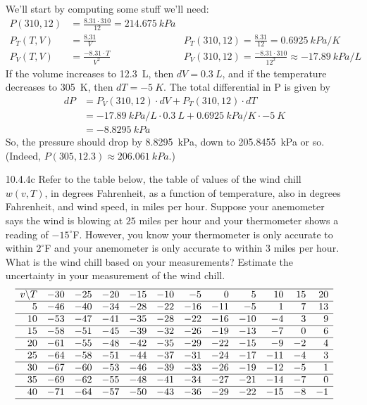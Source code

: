 \begin{enumerate}[leftmargin=0pt]
    \begin{red}
    We'll start by computing some stuff we'll need:
    \begin{align*}
        P(310, 12) &= \frac{8.31\cdot310}{12} = \SI{214.675}{kPa} \\
        P_T(T, V) &= \frac{8.31}{V}
        &P_T(310, 12) = \frac{8.31}{12} = \SI{0.6925}{kPa / K}\\
        P_V(T, V) &= \frac{-8.31\cdot T}{V^2}
        &P_V(310, 12) = \frac{-8.31\cdot 310}{12^2} \approx \SI{-17.89}{kPa / L}
    \end{align*}
    If the volume increases to \SI{12.3}{L}, then $dV = \SI{0.3}{L}$, and if the temperature decreases to \SI{305}{K}, then $dT = \SI{-5}{K}$. The total differential in P is given by 
    \begin{align*}
        dP &= P_V(310, 12) \cdot dV + P_T(310, 12) \cdot dT \\
        &= \SI{-17.89}{kPa / L} \cdot \SI{0.3}{L} + \SI{0.6925}{kPa / K}\cdot \SI{-5}{K} \\
        &= \SI{-8.8295 }{kPa}
    \end{align*}
    So, the pressure should drop by \SI{8.8295 }{kPa}, down to \SI{205.8455}{kPa} or so. (Indeed, $P(305, 12.3) \approx \SI{206.061}{kPa}$.)
    \end{red}
    \pagebreak
    
    \item[10.4.4c] Refer to the table below, the table of values of the wind chill $w(v, T)$, in degrees Fahrenheit, as a function of temperature, also in degrees Fahrenheit, and wind speed, in miles per hour. Suppose your anemometer says the wind is blowing at $25$ miles per hour and your thermometer shows a reading of $-15^\circ$F. However, you know your thermometer is only accurate to within $2^\circ$F and your anemometer is only accurate to within 3 miles per hour. What is the wind chill based on your measurements? Estimate the uncertainty in your measurement of the wind chill.
\[\begin{array}{rrrrrrrrrrrr}
\hline v \backslash T & -30 & -25 & -20 & -15 & -10 & -5 & 0 & 5 & 10 & 15 & 20 \\
\hline 5 & -46 & -40 & -34 & -28 & -22 & -16 & -11 & -5 & 1 & 7 & 13 \\
\hline 10 & -53 & -47 & -41 & -35 & -28 & -22 & -16 & -10 & -4 & 3 & 9 \\
\hline 15 & -58 & -51 & -45 & -39 & -32 & -26 & -19 & -13 & -7 & 0 & 6 \\
\hline 20 & -61 & -55 & -48 & -42 & -35 & -29 & -22 & -15 & -9 & -2 & 4 \\
\hline 25 & -64 & -58 & -51 & -44 & -37 & -31 & -24 & -17 & -11 & -4 & 3 \\
\hline 30 & -67 & -60 & -53 & -46 & -39 & -33 & -26 & -19 & -12 & -5 & 1 \\
\hline 35 & -69 & -62 & -55 & -48 & -41 & -34 & -27 & -21 & -14 & -7 & 0 \\
\hline 40 & -71 & -64 & -57 & -50 & -43 & -36 & -29 & -22 & -15 & -8 & -1 \\
\hline
\end{array}\]


\end{enumerate}
